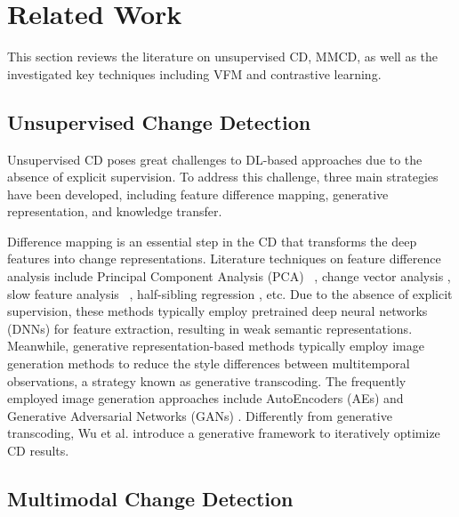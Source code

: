 \section{Related Work}\label{sc2}

This section reviews the literature on unsupervised CD, MMCD, as well as the investigated key techniques including VFM and contrastive learning.

\subsection{Unsupervised Change Detection}

Unsupervised CD poses great challenges to DL-based approaches due to the absence of explicit supervision. To address this challenge, three main strategies have been developed, including feature difference mapping, generative representation, and knowledge transfer.

Difference mapping is an essential step in the CD that transforms the deep features into change representations. Literature techniques on feature difference analysis include Principal Component Analysis (PCA) ~\cite{Bruzzone2000diff, Gao2016Automatic}, change vector analysis \cite{saha2019unsupervised, wu2021unsupervised}, slow feature analysis ~\cite{Wu2014Slow, Du2019Unsupervised}, half-sibling regression \cite{Kondmann2022Spatial}, etc. Due to the absence of explicit supervision, these methods typically employ pretrained deep neural networks (DNNs) for feature extraction, resulting in weak semantic representations. Meanwhile, generative representation-based methods typically employ image generation methods to reduce the style differences between multitemporal observations, a strategy known as generative transcoding. The frequently employed image generation approaches include AutoEncoders (AEs) \cite{Chen2022Unsupervised} and Generative Adversarial Networks (GANs) \cite{noh2022unsupervised}. Differently from generative transcoding, Wu et al. \cite{wu2023fully} introduce a generative framework to iteratively optimize CD results. 

\subsection{Multimodal Change Detection}

